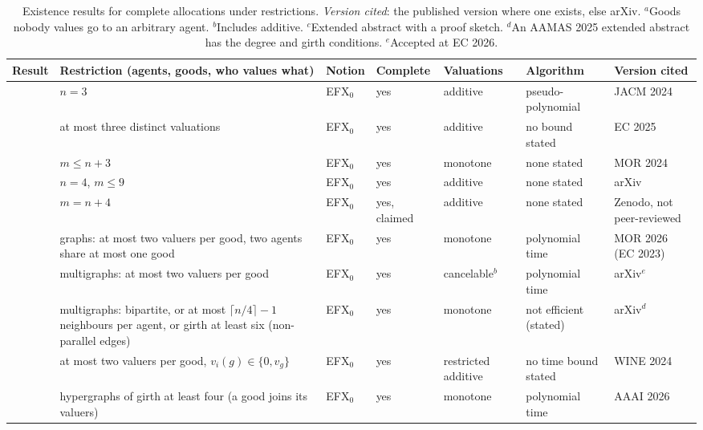 \documentclass[runningheads,11pt]{llncs}
\newcommand{\efxz}{\texorpdfstring{\mbox{EFX$_0$}}{EFX0}}
\begin{document}
\begin{table}[htbp]
\caption{Existence results for complete allocations under restrictions. \emph{Version cited}: the published version where one exists, else arXiv. $^a$Goods nobody values go to an arbitrary agent. $^b$Includes additive. $^c$Extended abstract with a proof sketch. $^d$An AAMAS 2025 extended abstract has the degree and girth conditions. $^e$Accepted at EC 2026.}\label{tab:rw}
\centering\scriptsize
\setlength{\tabcolsep}{3pt}\begin{tabular}{@{}>{\raggedright\arraybackslash}p{}>{\raggedright\arraybackslash}p{}>{\raggedright\arraybackslash}p{}>{\raggedright\arraybackslash}p{}>{\raggedright\arraybackslash}p{}>{\raggedright\arraybackslash}p{}>{\raggedright\arraybackslash}p{}@{}}
\toprule
Result & Restriction (agents, goods, who values what) & Notion & Complete & Valuations & Algorithm & Version cited \\
\midrule
\cite{ChaudhuryGM20} & $n=3$ & \efxz{} & yes & additive & pseudo-polynomial & JACM 2024 \\
\cite{HVGNV25} & at most three distinct valuations & \efxz{} & yes & additive & no bound stated & EC 2025 \\
\cite{Mahara21} & $m\le n+3$ & \efxz{} & yes & monotone & none stated & MOR 2024 \\
\cite{AlkassarFM26} & $n=4$, $m\le9$ & \efxz{} & yes & additive & none stated & arXiv \\
\cite{Bratby26} & $m=n+4$ & \efxz{} & yes, claimed & additive & none stated & Zenodo, not peer-reviewed \\
\cite{ChristodoulouFKS23} & graphs: at most two valuers per good, two agents share at most one good & \efxz{} & yes & monotone & polynomial time & MOR 2026 (EC 2023) \\
\cite{AfshinmehrAMMS26} & multigraphs: at most two valuers per good & \efxz{} & yes & cancelable$^b$ & polynomial time & arXiv$^e$ \\
\cite{SgouritsaS25} & multigraphs: bipartite, or at most $\lceil n/4\rceil-1$ neighbours per agent, or girth at least six (non-parallel edges) & \efxz{} & yes & monotone & not efficient (stated) & arXiv$^d$ \\
\cite{KavianiSS24} & at most two valuers per good, $v_i(g)\in\{0,v_g\}$ & \efxz{} & yes & restricted additive & no time bound stated & WINE 2024 \\
\cite{LianeasSS26} & hypergraphs of girth at least four (a good joins its valuers) & \efxz{} & yes & monotone & polynomial time & AAAI 2026 \\

\end{tabular}
\end{table}
\end{document}
